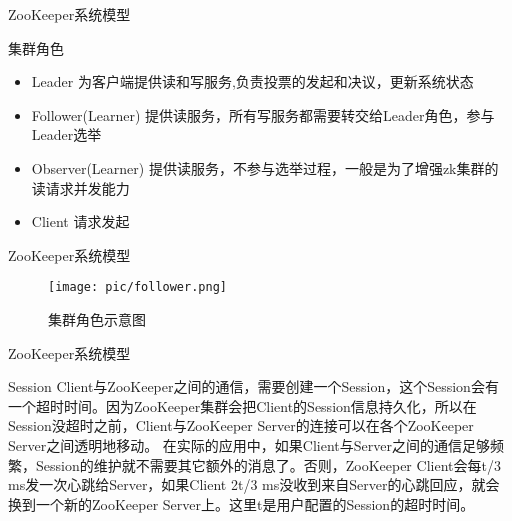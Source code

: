 \documentclass[10pt]{beamer}
\begin{document}
\begin{frame}[fragile]{ZooKeeper系统模型}
  \begin{alertblock}{集群角色}
    \begin{itemize}
      \item Leader 为客户端提供读和写服务,负责投票的发起和决议，更新系统状态
      \item Follower(Learner) 提供读服务，所有写服务都需要转交给Leader角色，参与Leader选举
      \item Observer(Learner) 提供读服务，不参与选举过程，一般是为了增强zk集群的读请求并发能力
      \item Client 请求发起
  \end{itemize}
  \end{alertblock}
\end{frame}

\begin{frame}[fragile]{ZooKeeper系统模型}
\begin{figure}
  \texttt{[image: pic/follower.png]}
  \caption{集群角色示意图}
\end{figure}
\end{frame}

\begin{frame}[fragile]{ZooKeeper系统模型}
  \begin{alertblock}{Session}
  Client与ZooKeeper之间的通信，需要创建一个Session，这个Session会有一个超时时间。因为ZooKeeper集群会把Client的Session信息持久化，所以在Session没超时之前，Client与ZooKeeper Server的连接可以在各个ZooKeeper Server之间透明地移动。\newline
  在实际的应用中，如果Client与Server之间的通信足够频繁，Session的维护就不需要其它额外的消息了。否则，ZooKeeper Client会每t/3 ms发一次心跳给Server，如果Client 2t/3 ms没收到来自Server的心跳回应，就会换到一个新的ZooKeeper Server上。这里t是用户配置的Session的超时时间。
  \end{alertblock}
\end{frame}
\end{document}
